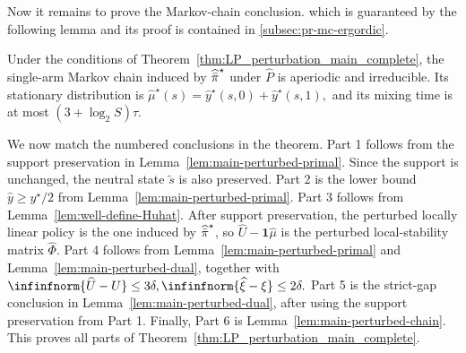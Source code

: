 \documentclass[mnsc,nonblindrev]{informs3}
\newcommand{\Phat}{\widehat{P}}
\newcommand{\one}{\mathbf{1}}
\newcommand{\pihbst}{\widehat{\Bar{\pi}}^\star}
\newcommand{\phihat}{\widehat{\Phi}}
\newcommand{\muhat}{\widehat{\mu}}
\newcommand{\uhat}{\widehat{U}}
\newcommand{\yhat}{\widehat{y}}
\newcommand{\xihat}{\widehat{\xi}}
\begin{document}
Now it remains to prove the Markov-chain conclusion.
which is guaranteed by the following lemma and its proof is contained in \ref{subsec:pr-mc-ergordic}.

\begin{lemma}
\label{lem:main-perturbed-chain}
Under the conditions of Theorem~\ref{thm:LP_perturbation_main_complete},
the single-arm Markov chain induced by \(\pihbst\) under \(\Phat\) is
aperiodic and irreducible. Its stationary distribution is
\(
    \muhat^\star(s)=\yhat^\star(s,0)+\yhat^\star(s,1),
\)
and its mixing time is at most \((3+\log_2S)\tau\).
\end{lemma}


We now match the numbered conclusions in the theorem. 
Part 1 follows from the support preservation in
Lemma~\ref{lem:main-perturbed-primal}. Since the support is unchanged, the
neutral state \(\tilde s\) is also preserved.
Part 2 is the lower bound
\(\yhat\ge y^\star/2\) from Lemma~\ref{lem:main-perturbed-primal}.
Part 3 follows from
Lemma~\ref{lem:well-define-Huhat}. After support preservation, the
perturbed locally linear policy is the one induced by \(\pihbst\), so
\(\uhat-\one\muhat\) is the perturbed local-stability matrix \(\phihat\).
Part 4 follows from
Lemma~\ref{lem:main-perturbed-primal} and
Lemma~\ref{lem:main-perturbed-dual}, together with
\(
    \infinfnorm{\uhat-U}\le 3\delta,
    \infinfnorm{\xihat-\xi}\le 2\delta.
\)
Part 5 is the strict-gap conclusion in
Lemma~\ref{lem:main-perturbed-dual}, after using the support preservation from Part 1. Finally,
Part 6 is
Lemma~\ref{lem:main-perturbed-chain}. This proves all parts of
Theorem~\ref{thm:LP_perturbation_main_complete}.





















\end{document}
